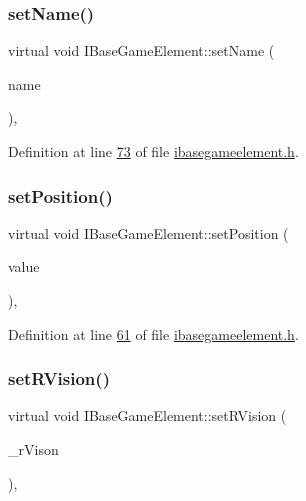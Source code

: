 \subsubsection{\texorpdfstring{set\+Name()}{setName()}}
{\footnotesize\ttfamily virtual void I\+Base\+Game\+Element\+::set\+Name (\begin{DoxyParamCaption}\item[{Q\+String}]{name }\end{DoxyParamCaption})\hspace{0.3cm}{\ttfamily [inline]}, {\ttfamily [virtual]}}



Definition at line \hyperlink{a00047_source_l00073}{73} of file \hyperlink{a00047_source}{ibasegameelement.\+h}.

\mbox{\label{a00137_a54dc1a743fac99db03c3f47b5c6d69c4}} 
\subsubsection{\texorpdfstring{set\+Position()}{setPosition()}}
{\footnotesize\ttfamily virtual void I\+Base\+Game\+Element\+::set\+Position (\begin{DoxyParamCaption}\item[{Q\+Vector3D $\ast$}]{value }\end{DoxyParamCaption})\hspace{0.3cm}{\ttfamily [inline]}, {\ttfamily [virtual]}}



Definition at line \hyperlink{a00047_source_l00061}{61} of file \hyperlink{a00047_source}{ibasegameelement.\+h}.

\mbox{\label{a00137_a2719e14051c30f39ca60f4998e48abf9}} 
\subsubsection{\texorpdfstring{set\+R\+Vision()}{setRVision()}}
{\footnotesize\ttfamily virtual void I\+Base\+Game\+Element\+::set\+R\+Vision (\begin{DoxyParamCaption}\item[{int}]{\+\_\+r\+Vison }\end{DoxyParamCaption})\hspace{0.3cm}{\ttfamily [inline]}, {\ttfamily [virtual]}}



